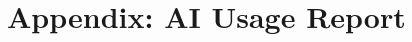 \documentclass[preprint,12pt]{elsarticle}
\begin{document}
\section*{Appendix: AI Usage Report}


\end{document}
